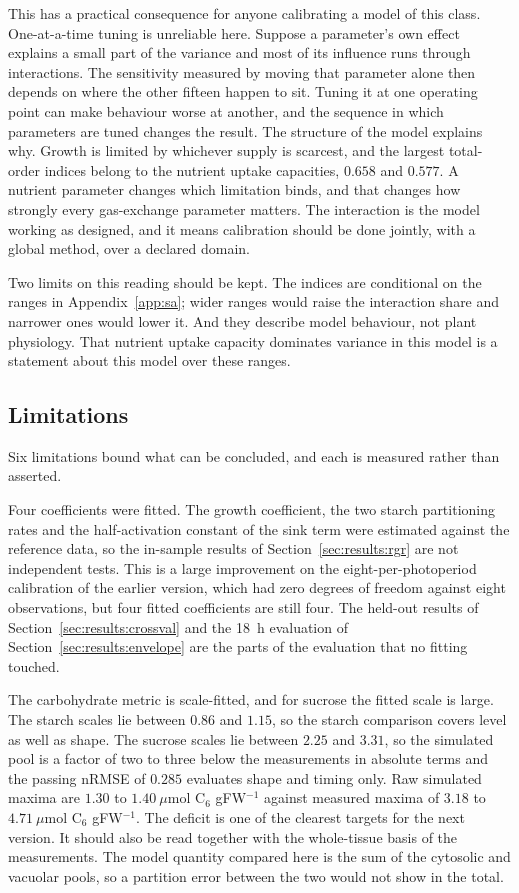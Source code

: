This has a practical consequence for anyone calibrating a model of this class.
One-at-a-time tuning is unreliable here. Suppose a parameter's own effect explains a small part of the variance and most
of its influence runs through interactions. The sensitivity measured by moving that
parameter alone then depends on where the other fifteen happen to sit. Tuning it at one operating point can make behaviour
worse at another, and the sequence in which parameters are tuned changes the
result. The structure of the model explains why. Growth is limited by whichever
supply is scarcest, and the largest total-order indices belong to the nutrient
uptake capacities, $0.658$ and $0.577$. A nutrient parameter changes which
limitation binds, and that changes how strongly every gas-exchange parameter
matters. The interaction is the model working as designed, and it means
calibration should be done jointly, with a global method, over a declared
domain.

Two limits on this reading should be kept. The indices are conditional on the
ranges in Appendix~\ref{app:sa}; wider ranges would raise the interaction share
and narrower ones would lower it. And they describe model behaviour, not plant
physiology. That nutrient uptake capacity dominates variance in this model is a
statement about this model over these ranges.

\subsection{Limitations}
\label{sec:limitations}

Six limitations bound what can be concluded, and each is measured rather than
asserted.

Four coefficients were fitted. The growth coefficient, the two starch
partitioning rates and the half-activation constant of the sink term were
estimated against the reference data, so the in-sample results of
Section~\ref{sec:results:rgr} are not independent tests. This is a large
improvement on the eight-per-photoperiod calibration of the earlier version,
which had zero degrees of freedom against eight observations, but four fitted
coefficients are still four. The held-out results of
Section~\ref{sec:results:crossval} and the 18~h evaluation of
Section~\ref{sec:results:envelope} are the parts of the evaluation that no
fitting touched.

The carbohydrate metric is scale-fitted, and for sucrose the fitted scale is
large. The starch scales lie between $0.86$ and $1.15$, so the starch
comparison covers level as well as shape. The sucrose scales lie between $2.25$
and $3.31$, so the simulated pool is a factor of two to three below the
measurements in absolute terms and the passing nRMSE of $0.285$ evaluates shape
and timing only. Raw simulated maxima are $1.30$ to $1.40~\mu\mathrm{mol}$
C$_6$ gFW$^{-1}$ against measured maxima of $3.18$ to
$4.71~\mu\mathrm{mol}$ C$_6$ gFW$^{-1}$. The deficit is one of the clearest
targets for the next version. It should also be read together with the
whole-tissue basis of the measurements. The model quantity compared here is the
sum of the cytosolic and vacuolar pools, so a partition error between the two
would not show in the total.

